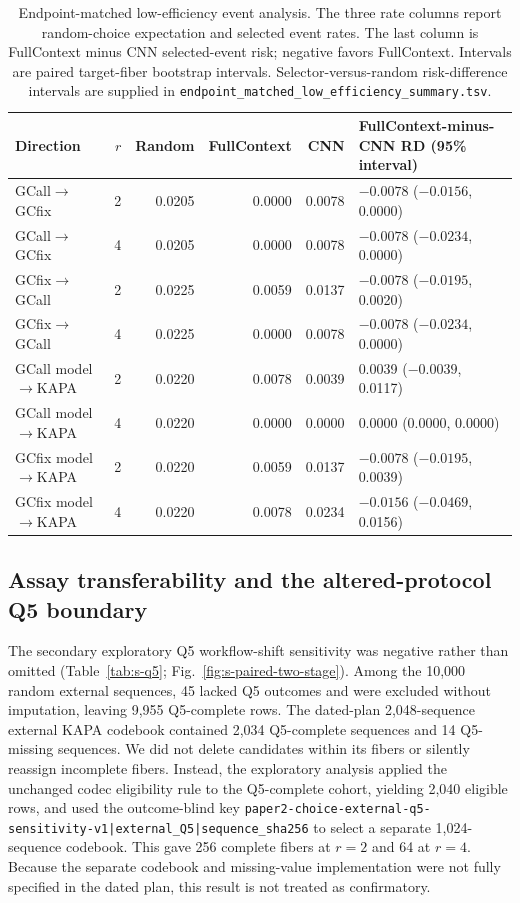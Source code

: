 \documentclass[10pt]{article}
\begin{document}
\begin{table}[H]
\centering
\scriptsize
\begin{tabular}{@{}lrrrrl@{}}
\toprule
Direction & $r$ & Random & FullContext & CNN & FullContext-minus-CNN RD (95\% interval) \\
\midrule
GCall$\rightarrow$GCfix & 2 & 0.0205 & 0.0000 & 0.0078 & $-0.0078$ ($-0.0156$, 0.0000) \\
GCall$\rightarrow$GCfix & 4 & 0.0205 & 0.0000 & 0.0078 & $-0.0078$ ($-0.0234$, 0.0000) \\
GCfix$\rightarrow$GCall & 2 & 0.0225 & 0.0059 & 0.0137 & $-0.0078$ ($-0.0195$, 0.0020) \\
GCfix$\rightarrow$GCall & 4 & 0.0225 & 0.0000 & 0.0078 & $-0.0078$ ($-0.0234$, 0.0000) \\
GCall model$\rightarrow$KAPA & 2 & 0.0220 & 0.0078 & 0.0039 & 0.0039 ($-0.0039$, 0.0117) \\
GCall model$\rightarrow$KAPA & 4 & 0.0220 & 0.0000 & 0.0000 & 0.0000 (0.0000, 0.0000) \\
GCfix model$\rightarrow$KAPA & 2 & 0.0220 & 0.0059 & 0.0137 & $-0.0078$ ($-0.0195$, 0.0039) \\
GCfix model$\rightarrow$KAPA & 4 & 0.0220 & 0.0078 & 0.0234 & $-0.0156$ ($-0.0469$, 0.0156) \\
\bottomrule
\end{tabular}
\caption{Endpoint-matched low-efficiency event analysis. The three rate columns report random-choice expectation and selected event rates. The last column is FullContext minus CNN selected-event risk; negative favors FullContext. Intervals are paired target-fiber bootstrap intervals. Selector-versus-random risk-difference intervals are supplied in \texttt{endpoint\_matched\_low\_efficiency\_summary.tsv}.}
\label{tab:s-event}
\end{table}

\subsection{Assay transferability and the altered-protocol Q5 boundary}

The secondary exploratory Q5 workflow-shift sensitivity was negative rather than omitted (Table~\ref{tab:s-q5}; Fig.~\ref{fig:s-paired-two-stage}). Among the 10,000 random external sequences, 45 lacked Q5 outcomes and were excluded without imputation, leaving 9,955 Q5-complete rows. The dated-plan 2,048-sequence external KAPA codebook contained 2,034 Q5-complete sequences and 14 Q5-missing sequences. We did not delete candidates within its fibers or silently reassign incomplete fibers. Instead, the exploratory analysis applied the unchanged codec eligibility rule to the Q5-complete cohort, yielding 2,040 eligible rows, and used the outcome-blind key \texttt{paper2-choice-external-q5-sensitivity-v1|external\_Q5|sequence\_sha256} to select a separate 1,024-sequence codebook. This gave 256 complete fibers at $r=2$ and 64 at $r=4$. Because the separate codebook and missing-value implementation were not fully specified in the dated plan, this result is not treated as confirmatory.
\end{document}
